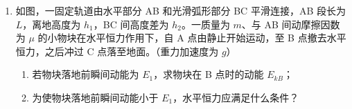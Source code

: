 \documentclass[\gkver]{gaokaozhenti}
\begin{document}
\begin{enumerate}
\begin{enumerate}
	\item
	某同学在实验过程中，多次改变摆线长度 $l$，测量相应的摆球摆动周期 $T$，获得 $T^{2}-l$ 关系如图所示，由此可得重力加速度值为 $\Umsq$。（保留到小数点后 2 位）

	\item
	为了减小误差，应在摆球经过最低点还是到达最高点开始计时？为什么？
\end{enumerate}
\onepicture[align=right, w=5.00cm]{}

\item
如图，一固定轨道由水平部分 AB 和光滑弧形部分 BC 平滑连接，AB 段长为 $L$，离地高度为 $h_{1}$，BC 间高度差为 $h_{2}$。一质量为 $m$、与 AB 间动摩擦因数为 $\mu$ 的小物块在水平恒力作用下，自 A 点由静止开始运动，至 B 点撤去水平恒力，之后冲过 C 点落至地面。（重力加速度为 $g$）
\begin{enumerate}
	\item
	若物块落地前瞬间动能为 $E_{1}$，求物块在 B 点时的动能 $E_{kB}$；
	\item
	为使物块落地前瞬间动能小于 $E_{1}$，水平恒力应满足什么条件？
\end{enumerate}
\onepicture[align=right, w=5.50cm]{}
\end{enumerate}
\end{document}
